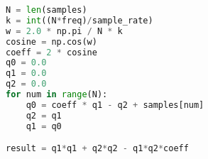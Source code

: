 \begin{lstlisting}[language=python,caption={Algorytm Goertzla -- Python},label={lst:algg}]
N = len(samples)
k = int((N*freq)/sample_rate)
w = 2.0 * np.pi / N * k
cosine = np.cos(w)
coeff = 2 * cosine
q0 = 0.0
q1 = 0.0
q2 = 0.0
for num in range(N):
	q0 = coeff * q1 - q2 + samples[num]
	q2 = q1
	q1 = q0

result = q1*q1 + q2*q2 - q1*q2*coeff
\end{lstlisting}
\vspace{10pt}

